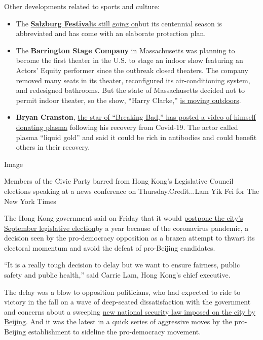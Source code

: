 Other developments related to sports and culture:

\begin{itemize}
\item
  The
  \textbf{\href{https://www.nytimes3xbfgragh.onion/2020/07/31/arts/music/salzburg-festival-coronavirus-cosi.html}{Salzburg
  Festival}}\href{https://www.nytimes3xbfgragh.onion/2020/07/31/arts/music/salzburg-festival-coronavirus-cosi.html}{is
  still going on}but its centennial season is abbreviated and has come
  with an elaborate protection plan.
\item
  The \textbf{Barrington Stage Company} in Massachusetts was planning to
  become the first theater in the U.S. to stage an indoor show featuring
  an Actors' Equity performer since the outbreak closed theaters. The
  company removed many seats in its theater, reconfigured its
  air-conditioning system, and redesigned bathrooms. But the state of
  Massachusetts decided not to permit indoor theater, so the show,
  ``Harry Clarke,''
  \href{https://www.nytimes3xbfgragh.onion/2020/07/30/theater/the-first-equity-authorized-indoor-theater-is-moving-outdoors.html}{is
  moving outdoors}.
\item
  \textbf{Bryan Cranston},
  \href{https://www.nytimes3xbfgragh.onion/2020/07/31/arts/television/bryan-cranston-coronavirus-plasma.html}{the
  star of ``Breaking Bad,'' has posted a video of himself donating
  plasma} following his recovery from Covid-19. The actor called plasma
  ``liquid gold'' and said it could be rich in antibodies and could
  benefit others in their recovery.
\end{itemize}

Image

Members of the Civic Party barred from Hong Kong's Legislative Council
elections speaking at a news conference on Thursday.Credit...Lam Yik Fei
for The New York Times

The Hong Kong government said on Friday that it would
\href{https://www.nytimes3xbfgragh.onion/2020/07/31/world/asia/hong-kong-election-delayed.html}{postpone
the city's September legislative election}by a year because of the
coronavirus pandemic, a decision seen by the pro-democracy opposition as
a brazen attempt to thwart its electoral momentum and avoid the defeat
of pro-Beijing candidates.

``It is a really tough decision to delay but we want to ensure fairness,
public safety and public health,'' said Carrie Lam, Hong Kong's chief
executive.

The delay was a blow to opposition politicians, who had expected to ride
to victory in the fall on a wave of deep-seated dissatisfaction with the
government and concerns about a sweeping
\href{https://www.nytimes3xbfgragh.onion/2020/07/05/world/asia/hong-kong-security-law.html}{new
national security law imposed on the city by Beijing}. And it was the
latest in a quick series of aggressive moves by the pro-Beijing
establishment to sideline the pro-democracy movement.

